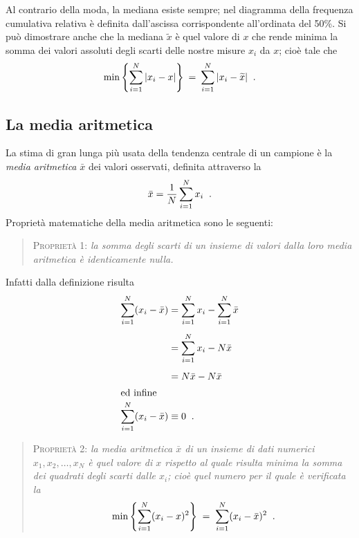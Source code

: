 Al contrario della moda, la mediana esiste sempre; nel
diagramma della frequenza cumulativa relativa \`e definita
dall'ascissa corrispondente all'ordinata del 50\%.  Si pu\`o
dimostrare anche che la mediana $\widetilde x$ \`e quel
valore di $x$ che rende minima la somma dei valori assoluti
degli scarti delle nostre misure $x_{i}$ da $x$; cio\`e tale
che
\begin{equation*}
  \min \left\{ \sum_{i=1}^N | x_i - x | \right\}
  \: = \: \sum_{i=1}^N | x_i - \widetilde x | \;\; .
\end{equation*}%

\subsection{La media aritmetica}%
\label{ch:4.medari}
La stima di gran lunga pi\`u usata della tendenza centrale
di un campione \`e la \emph{media aritmetica} $\bar x$ dei
valori osservati, definita attraverso la
\begin{equation} \label{eq:4.mediar}
  \bar x = \frac{1}{N} \sum_{i=1}^N x_i \;\; .
\end{equation}
Propriet\`a matematiche della media aritmetica sono le
seguenti:%
\begin{quote}
  \textsc{Propriet\`a 1:} \textit{la somma degli scarti di
    un insieme di valori dalla loro media aritmetica \`e
    identicamente nulla.}
\end{quote}
Infatti dalla definizione risulta
\begin{align}
  \sum_{i=1}^N ( x_i - \bar x ) &=
    \sum_{i=1}^N x_i - \sum_{i=1}^N  \bar x
    \notag \\[1ex]
  &= \sum_{i=1}^N x_i - N \bar x \notag \\[1ex]
  &= N \bar x - N \bar x \notag \\
  \intertext{ed infine}
  \sum_{i=1}^N ( x_i - \bar x ) &\equiv 0 \;\;
  . \label{eq:4.mprop1}
\end{align}

\begin{quote}
  \textsc{Propriet\`a 2:} \textit{la media aritmetica $\bar
    x$ di un insieme di dati numerici $x_1, x_2,\ldots, x_N$
    \`e quel valore di $x$ rispetto al quale risulta minima
    la somma dei quadrati degli scarti dalle $x_i$; cio\`e
    quel numero per il quale \`e verificata la}
  \begin{equation*}
    \min \left \{ \sum_{i=1}^N (x_i - x)^2 \right \}
    \; = \; \sum_{i=1}^N ( x_i - \bar x ) ^2 \;\; .
  \end{equation*}
\end{quote}

